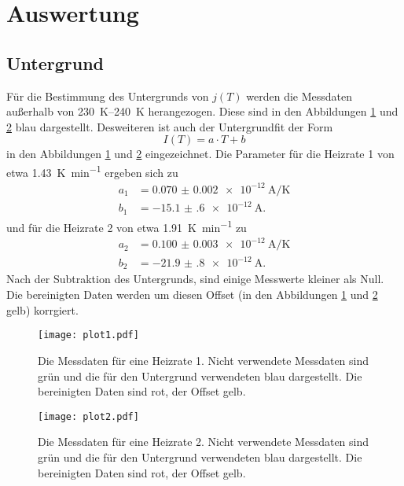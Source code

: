 \section{Auswertung}
\label{sec:Auswertung}

\subsection{Untergrund}
\label{sec:Unter}
Für die Bestimmung des Untergrunds von $j(T)$ werden die Messdaten außerhalb von \SIrange{230}{240}{\kelvin} herangezogen.
Diese sind in den Abbildungen \ref{fig:plot1} und \ref{fig:plot2} blau dargestellt.
Desweiteren ist auch der Untergrundfit der Form
\begin{equation}
    \label{eqn:exp}
    I(T) = a \cdot T + b
\end{equation}
in den Abbildungen \ref{fig:plot1} und \ref{fig:plot2} eingezeichnet.
Die Parameter für die Heizrate 1 von etwa \SI{1.43}{\kelvin\per\minute} ergeben sich zu
\begin{align*}
    a_1 &= \SI{0.070(2)e-12}{\ampere\per\kelvin} \\
    b_1 &= \SI{-15.1(6)e-12}{\ampere}.
\end{align*}
und für die Heizrate 2 von etwa \SI{1.91}{\kelvin\per\minute} zu
\begin{align*}
  a_2 &= \SI{0.100(3)e-12}{\ampere\per\kelvin} \\
  b_2 &= \SI{-21.9(8)e-12}{\ampere}.
\end{align*}
Nach der Subtraktion des Untergrunds, sind einige Messwerte kleiner als Null.
Die bereinigten Daten werden um diesen Offset (in den Abbildungen \ref{fig:plot1} und \ref{fig:plot2} gelb) korrgiert.

\begin{figure}
  \centering
  \texttt{[image: plot1.pdf]}
  \caption{Die Messdaten für eine Heizrate 1. Nicht verwendete Messdaten sind grün und die für den Untergrund verwendeten blau dargestellt. Die bereinigten Daten sind rot, der Offset gelb.}
  \label{fig:plot1}
\end{figure}
\begin{figure}
  \centering
  \texttt{[image: plot2.pdf]}
  \caption{Die Messdaten für eine Heizrate 2. Nicht verwendete Messdaten sind grün und die für den Untergrund verwendeten blau dargestellt. Die bereinigten Daten sind rot, der Offset gelb.}
  \label{fig:plot2}
\end{figure}
\FloatBarrier

